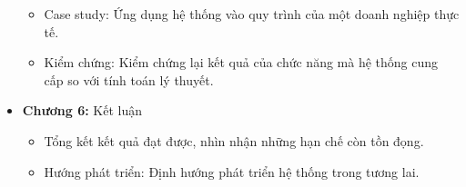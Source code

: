 \begin{itemize}
\begin{itemize}
            \item Case study: Ứng dụng hệ thống vào quy trình của một doanh nghiệp thực tế.
            \item Kiểm chứng: Kiểm chứng lại kết quả của chức năng mà hệ thống cung cấp so với tính toán lý thuyết.
          \end{itemize}
      \item \textbf{Chương 6:} Kết luận
          \begin{itemize}
            \item Tổng kết kết quả đạt được, nhìn nhận những hạn chế còn tồn đọng.
            \item Hướng phát triển: Định hướng phát triển hệ thống trong tương lai.
          \end{itemize}
\end{itemize}